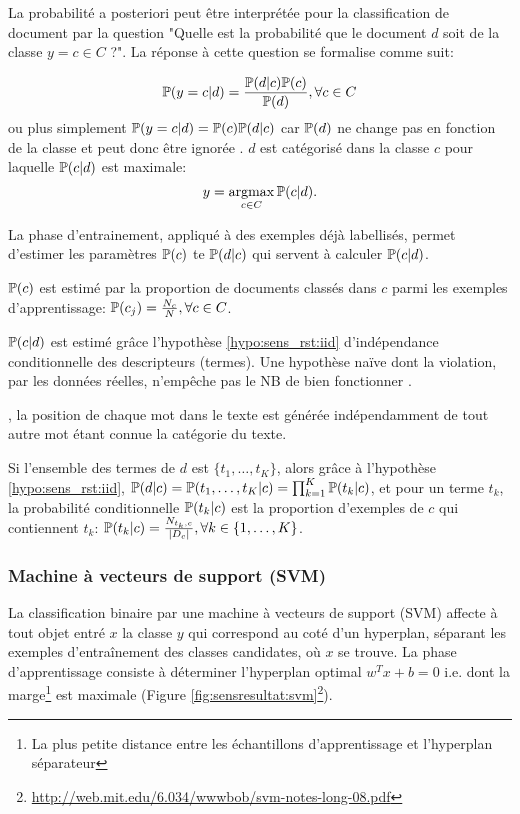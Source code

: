 La probabilité a posteriori peut être interprétée pour la classification de document par la question "Quelle est la probabilité que le document $d$ soit de la classe $y=c \in C$ ?". La réponse à cette question se formalise comme suit:

\[\mathbb{P}(y=c \vert d) = \frac{\mathbb{P}(d \vert c)\mathbb{P}(c)}{\mathbb{P}(d)}, \forall c \in C \]
ou plus simplement  $\mathbb{P}(y = c \vert d) = \mathbb{P}(c)\mathbb{P}(d \vert c)$ car $\mathbb{P}(d)$ ne change pas en fonction de la classe et peut donc être ignorée \citep{rish2001nb_study}. $d$ est catégorisé dans la classe $c$ pour laquelle $\mathbb{P}(c \vert d)$ est maximale: \[y = \mathop{\mathrm{argmax}}\limits_{c \in C} \mathbb{P}(c \vert d).\]

 La phase d'entrainement, appliqué à des exemples déjà labellisés, permet d'estimer les paramètres $\mathbb{P}(c)$ te $\mathbb{P}(d \vert c)$ qui servent à calculer $\mathbb{P}(c \vert d)$.

$\mathbb{P}(c)$ est estimé par la proportion de documents classés dans $c$ parmi les exemples d'apprentissage: $\mathbb{P}(c_j) = \frac{N_c}{N}, \forall c \in C$.


 $\mathbb{P}(c \vert d)$ est estimé grâce l'hypothèse \ref{hypo:sens_rst:iid} d'{indépendance conditionnelle des descripteurs (termes)}. Une hypothèse naïve dont la violation, par les données réelles, n'empêche pas le NB de bien fonctionner \citep{rish2001nb_study}. 

\begin{hypothese}, la position de chaque mot dans le texte est générée indépendamment de tout autre mot étant connue la catégorie du texte. \label{hypo:sens_rst:iid}
\end{hypothese}

Si l'ensemble des termes de $d$ est $\lbrace t_{1}, \dots, t_{K} \rbrace$, alors grâce à l'hypothèse \ref{hypo:sens_rst:iid},
$\mathbb{P}(d \vert c) = \mathbb{P}(t_{1}, \dots, t_{K}\vert c) = \prod_{k=1}^K \mathbb{P}(t_{k} \vert c)$, et pour un terme $t_k$, la probabilité conditionnelle $\mathbb{P}(t_k \vert c)$ est la proportion d'exemples de $c$ qui contiennent $t_k$:  $\mathbb{P}(t_k \vert c) = \frac{N_{t_k,c}}{\vert D_c \vert }, \forall k \in \lbrace 1, \dots, K \rbrace$.

\subsubsection{Machine à vecteurs de support (SVM)}
La classification binaire par une machine à vecteurs de support (SVM) \citep{vapnik1995statlearning} affecte à tout objet entré $x$ la classe $y$ qui correspond au coté d'un hyperplan, séparant les exemples d'entraînement des classes candidates, où $x$ se trouve. La phase d'apprentissage consiste à déterminer l'hyperplan optimal $w^T x + b = 0$ i.e. dont la marge\footnote{La plus petite distance entre les échantillons d'apprentissage et l'hyperplan séparateur} est maximale (Figure \ref{fig:sensresultat:svm}\footnote{\url{http://web.mit.edu/6.034/wwwbob/svm-notes-long-08.pdf}}).

